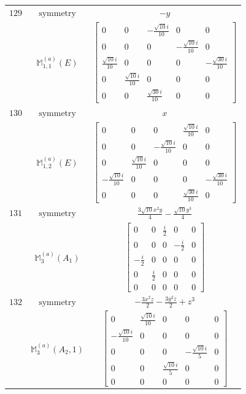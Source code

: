 \documentclass[fleqn,8pt,landscape]{jsarticle}
\begin{document}
\begin{longtable}{ccc}
$ 129 $ & $ \text{symmetry} $ & $ - y $ \\
$  $ & $ \mathbb{M}_{1,1}^{(a)}(E) $ & $ \begin{bmatrix} 0 & 0 & - \frac{\sqrt{10} i}{10} & 0 & 0 \\ 0 & 0 & 0 & - \frac{\sqrt{10} i}{10} & 0 \\ \frac{\sqrt{10} i}{10} & 0 & 0 & 0 & - \frac{\sqrt{30} i}{10} \\ 0 & \frac{\sqrt{10} i}{10} & 0 & 0 & 0 \\ 0 & 0 & \frac{\sqrt{30} i}{10} & 0 & 0 \end{bmatrix} $ \\ \hline
$ 130 $ & $ \text{symmetry} $ & $ x $ \\
$  $ & $ \mathbb{M}_{1,2}^{(a)}(E) $ & $ \begin{bmatrix} 0 & 0 & 0 & \frac{\sqrt{10} i}{10} & 0 \\ 0 & 0 & - \frac{\sqrt{10} i}{10} & 0 & 0 \\ 0 & \frac{\sqrt{10} i}{10} & 0 & 0 & 0 \\ - \frac{\sqrt{10} i}{10} & 0 & 0 & 0 & - \frac{\sqrt{30} i}{10} \\ 0 & 0 & 0 & \frac{\sqrt{30} i}{10} & 0 \end{bmatrix} $ \\ \hline
$ 131 $ & $ \text{symmetry} $ & $ \frac{3 \sqrt{10} x^{2} y}{4} - \frac{\sqrt{10} y^{3}}{4} $ \\
$  $ & $ \mathbb{M}_{3}^{(a)}(A_{1}) $ & $ \begin{bmatrix} 0 & 0 & \frac{i}{2} & 0 & 0 \\ 0 & 0 & 0 & - \frac{i}{2} & 0 \\ - \frac{i}{2} & 0 & 0 & 0 & 0 \\ 0 & \frac{i}{2} & 0 & 0 & 0 \\ 0 & 0 & 0 & 0 & 0 \end{bmatrix} $ \\ \hline
$ 132 $ & $ \text{symmetry} $ & $ - \frac{3 x^{2} z}{2} - \frac{3 y^{2} z}{2} + z^{3} $ \\
$  $ & $ \mathbb{M}_{3}^{(a)}(A_{2},1) $ & $ \begin{bmatrix} 0 & \frac{\sqrt{10} i}{10} & 0 & 0 & 0 \\ - \frac{\sqrt{10} i}{10} & 0 & 0 & 0 & 0 \\ 0 & 0 & 0 & - \frac{\sqrt{10} i}{5} & 0 \\ 0 & 0 & \frac{\sqrt{10} i}{5} & 0 & 0 \\ 0 & 0 & 0 & 0 & 0 \end{bmatrix} $ \\ \hline

\end{longtable}
\end{document}
